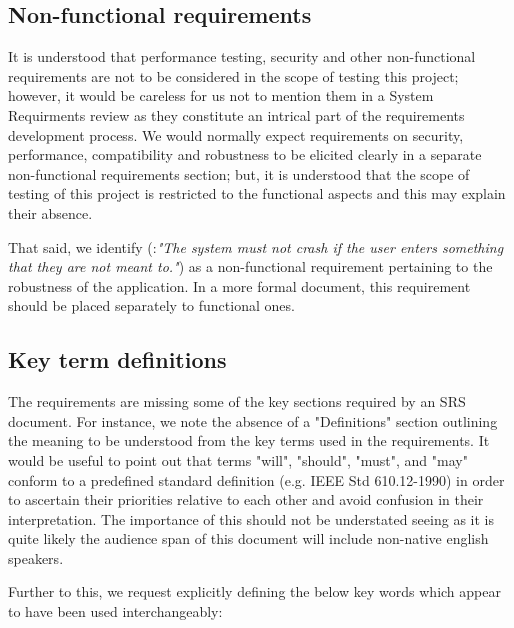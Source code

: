 \subsection{Non-functional requirements}
\label{sec:non-functional-requirements}
It is understood that performance testing, security and other non-functional requirements are not to be considered in the scope of testing this project; however, it would be careless for us not to mention them in a System Requirments review as they constitute an intrical part of the requirements development process. 
We would normally expect requirements on security, performance, compatibility and robustness to be elicited clearly in a separate non-functional requirements section; but, it is understood that the scope of testing of this project is restricted to the functional aspects and this may explain their absence. 
\par
That said, we identify (\RSeven:\textit{"The system must not crash if the user enters something that they are not meant to."}) as a non-functional requirement pertaining to the robustness of the application. In a more formal document, this requirement should be placed separately to functional ones.    
%
\par

\subsection{Key term definitions}
\label{sec:key-term-definitions}
The requirements are missing some of the key sections required by an SRS document.
For instance, we note the absence of a "Definitions" section outlining the meaning to be understood from the key terms used in the requirements.
It would be useful to point out that terms "will", "should", "must", and "may" conform to a predefined standard definition (e.g. IEEE Std 610.12-1990) in order to ascertain their priorities relative to each other and avoid confusion in their interpretation. 
The importance of this should not be understated seeing as it is quite likely the audience span of this document will include non-native english speakers. 
\par
Further to this, we request explicitly defining the below key words which  appear to have been used interchangeably:  

